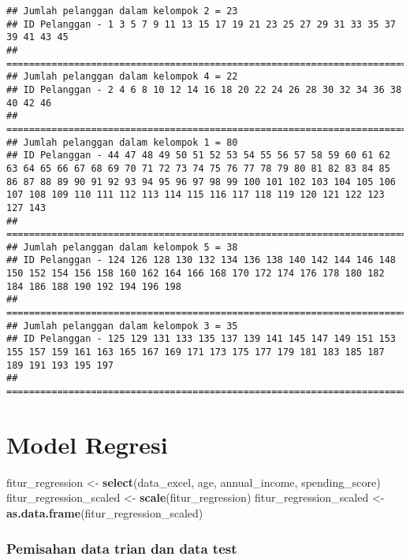 \documentclass[
]{article}
\newenvironment{Shaded}{\begin{snugshade}}{\end{snugshade}}
\newcommand{\FunctionTok}[1]{\textcolor[rgb]{0.13,0.29,0.53}{\textbf{#1}}}
\newcommand{\NormalTok}[1]{#1}
\newcommand{\OtherTok}[1]{\textcolor[rgb]{0.56,0.35,0.01}{#1}}
\begin{document}
\begin{verbatim}
## Jumlah pelanggan dalam kelompok 2 = 23 
## ID Pelanggan - 1 3 5 7 9 11 13 15 17 19 21 23 25 27 29 31 33 35 37 39 41 43 45 
## ==========================================================================================
## Jumlah pelanggan dalam kelompok 4 = 22 
## ID Pelanggan - 2 4 6 8 10 12 14 16 18 20 22 24 26 28 30 32 34 36 38 40 42 46 
## ==========================================================================================
## Jumlah pelanggan dalam kelompok 1 = 80 
## ID Pelanggan - 44 47 48 49 50 51 52 53 54 55 56 57 58 59 60 61 62 63 64 65 66 67 68 69 70 71 72 73 74 75 76 77 78 79 80 81 82 83 84 85 86 87 88 89 90 91 92 93 94 95 96 97 98 99 100 101 102 103 104 105 106 107 108 109 110 111 112 113 114 115 116 117 118 119 120 121 122 123 127 143 
## ==========================================================================================
## Jumlah pelanggan dalam kelompok 5 = 38 
## ID Pelanggan - 124 126 128 130 132 134 136 138 140 142 144 146 148 150 152 154 156 158 160 162 164 166 168 170 172 174 176 178 180 182 184 186 188 190 192 194 196 198 
## ==========================================================================================
## Jumlah pelanggan dalam kelompok 3 = 35 
## ID Pelanggan - 125 129 131 133 135 137 139 141 145 147 149 151 153 155 157 159 161 163 165 167 169 171 173 175 177 179 181 183 185 187 189 191 193 195 197 
## ==========================================================================================
\end{verbatim}

\hypertarget{model-regresi}{%
\section{Model Regresi}\label{model-regresi}}

\begin{Shaded}
\begin{Highlighting}[]
\NormalTok{fitur\_regression }\OtherTok{\textless{}{-}} \FunctionTok{select}\NormalTok{(data\_excel, age, annual\_income, spending\_score)}
\NormalTok{fitur\_regression\_scaled }\OtherTok{\textless{}{-}} \FunctionTok{scale}\NormalTok{(fitur\_regression)}
\NormalTok{fitur\_regression\_scaled }\OtherTok{\textless{}{-}} \FunctionTok{as.data.frame}\NormalTok{(fitur\_regression\_scaled)}
\end{Highlighting}
\end{Shaded}

\hypertarget{pemisahan-data-trian-dan-data-test}{%
\subsubsection{Pemisahan data trian dan data
test}\label{pemisahan-data-trian-dan-data-test}}
\end{document}
